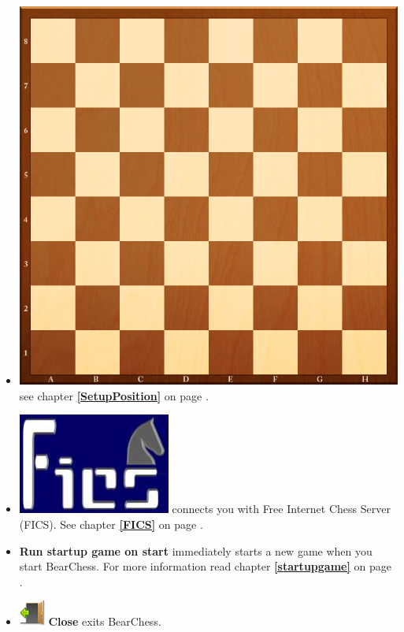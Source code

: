 \documentclass[11pt,a4paper]{article}
\begin{document}
\begin{itemize}
	\item \includegraphics[scale=0.03]{Chess_Board.png} see chapter \textbf{\ref{SetupPosition}  } on page \pageref{SetupPosition}.
	
	\item \includegraphics[scale=0.1]{FicsLogo.png} connects you with Free Internet Chess Server (FICS). See chapter \textbf{\ref{FICS}  } on page \pageref{FICS}.	
	
	\item \textbf{Run startup game on start} immediately starts a new game when you start BearChess. For more information read chapter \textbf{\ref{startupgame}  } on page \pageref{startupgame}.
	
	\item \includegraphics[scale=0.5]{door_out.png} \textbf{Close} exits BearChess.
\end{itemize}
\end{document}
